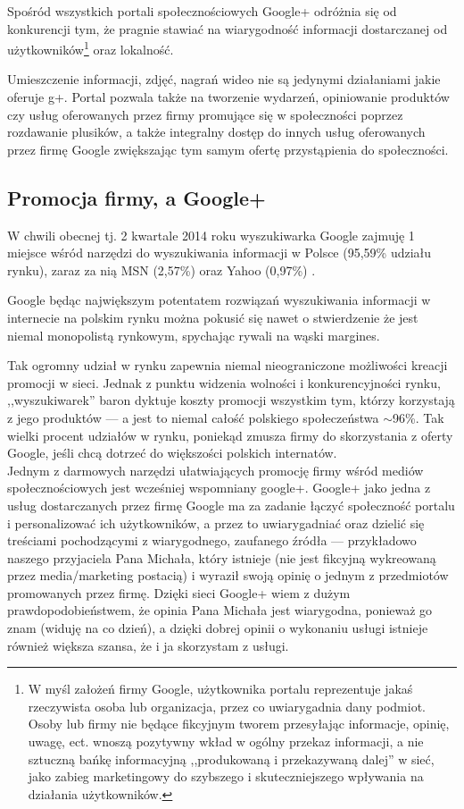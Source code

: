 Spośród wszystkich portali społecznościowych Google+ odróżnia się od konkurencji tym, że pragnie stawiać na wiarygodność informacji dostarczanej od użytkowników\footnote{W myśl założeń firmy Google, użytkownika portalu reprezentuje jakaś rzeczywista osoba lub organizacja, przez co uwiarygadnia dany podmiot. Osoby lub firmy nie będące fikcyjnym tworem przesyłając informacje, opinię, uwagę, ect. wnoszą pozytywny wkład w ogólny przekaz informacji, a nie sztuczną bańkę informacyjną ,,produkowaną i przekazywaną dalej'' w sieć, jako zabieg marketingowy do szybszego i skuteczniejszego wpływania na działania użytkowników.} oraz lokalność.

Umieszczenie informacji, zdjęć, nagrań wideo nie są jedynymi działaniami jakie oferuje g+. Portal pozwala także na tworzenie wydarzeń, opiniowanie produktów czy usług oferowanych przez firmy promujące się w społeczności poprzez rozdawanie plusików, a także integralny dostęp do innych usług oferowanych przez firmę Google zwiększając tym samym ofertę przystąpienia do społeczności.


\subsection{Promocja firmy, a Google+}
W chwili obecnej tj. 2 kwartale 2014 roku wyszukiwarka Google zajmuję 1 miejsce wśród narzędzi do wyszukiwania informacji w Polsce (95,59\% udziału rynku), zaraz za nią MSN (2,57\%) oraz Yahoo (0,97\%) \cite{url:gemius-ranking-silnikow-wyszukiwarek}.

Google będąc największym potentatem rozwiązań wyszukiwania informacji w internecie na polskim rynku można pokusić się nawet o stwierdzenie że jest niemal monopolistą rynkowym, spychając rywali na wąski margines.

Tak ogromny udział w rynku zapewnia niemal nieograniczone możliwości kreacji promocji w sieci. Jednak z punktu widzenia wolności i konkurencyjności rynku, ,,wyszukiwarek'' baron dyktuje koszty promocji wszystkim tym, którzy korzystają z jego produktów --- a jest to niemal całość polskiego społeczeństwa $\sim$96\%. Tak wielki procent udziałów w rynku, poniekąd zmusza firmy do skorzystania z oferty Google, jeśli chcą dotrzeć do większości polskich internatów. \\


Jednym z darmowych narzędzi ułatwiających promocję firmy wśród mediów społecznościowych jest wcześniej wspomniany google+. Google+ jako jedna z usług dostarczanych przez firmę Google ma za zadanie łączyć społeczność portalu i personalizować ich użytkowników, a przez to uwiarygadniać oraz dzielić się treściami pochodzącymi z wiarygodnego, zaufanego źródła --- przykładowo naszego przyjaciela Pana Michała, który istnieje (nie jest fikcyjną wykreowaną przez media/marketing postacią) i wyraził swoją opinię o jednym z przedmiotów promowanych przez firmę. Dzięki sieci Google+ wiem z dużym prawdopodobieństwem, że opinia Pana Michała jest wiarygodna, ponieważ go znam (widuję na co dzień), a dzięki dobrej opinii o wykonaniu usługi istnieje również większa szansa, że i ja skorzystam z usługi.\\

